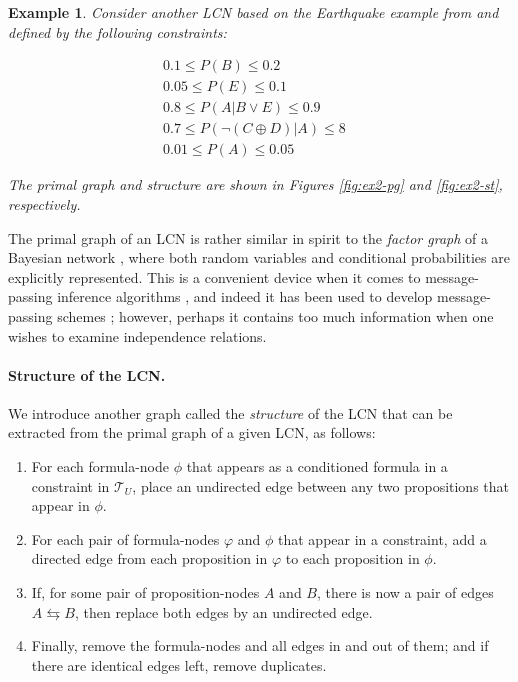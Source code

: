 \documentclass{article}
\newtheorem{example}{Example}
\begin{document}
\begin{example}\label{ex:Earthquake}
   Consider another LCN based on the Earthquake example from \cite{marinescu2023lcn} and defined by the following constraints:

\[
\begin{array}{ll}
0.1 \leq P(B) \leq 0.2 & \\
0.05 \leq P(E) \leq 0.1 & \\
0.8 \leq P(A|B \vee E) \leq 0.9 & \\
0.7 \leq P(\neg (C \oplus D) | A) \leq 8 & \\
0.01 \leq P(A) \leq 0.05 &
\end{array}
\]

    The primal graph and structure are shown in Figures \ref{fig:ex2-pg} and \ref{fig:ex2-st}, respectively.
\end{example}



The primal graph of an LCN is rather similar in spirit to the {\em factor graph} of a Bayesian network \cite{koller2009probabilistic}, where both random variables and conditional probabilities are explicitly represented. This is a convenient device when it comes to message-passing inference algorithms \cite{koller2009probabilistic}, and indeed it has been used to develop message-passing schemes \cite{marinescu2023lcn}; however, perhaps it contains too much information when one wishes to examine independence relations.

\paragraph{Structure of the LCN.} We introduce another graph called the {\em structure} of the LCN that can be extracted from the primal graph of a given LCN, as follows:

\begin{enumerate}
    \item For each formula-node $\phi$ that appears as a  conditioned formula in a constraint in $\mathcal{T}_U$, place an undirected edge between any two propositions that appear in $\phi$.
    \item For each pair of formula-nodes $\varphi$ and $\phi$ that appear in a constraint, add a directed edge from each proposition in $\varphi$ to each proposition in $\phi$.
    \item If, for some pair of proposition-nodes $A$ and $B$, there is now a pair of edges $A \leftrightarrows B$, then replace both edges by an undirected edge. 
    \item Finally, remove the formula-nodes and all edges in and out of them; and if there are identical edges left, remove duplicates.
\end{enumerate} 
\end{document}
